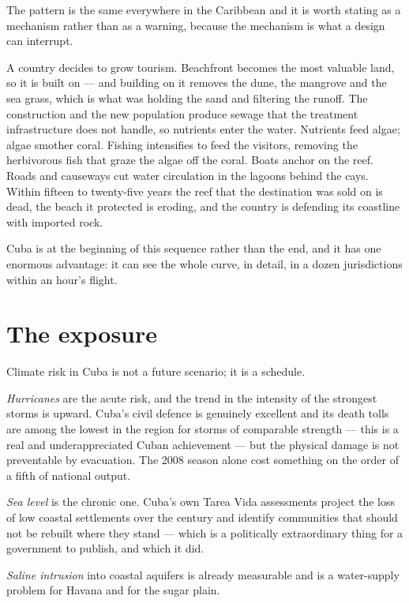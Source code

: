 The pattern is the same everywhere in the Caribbean and it is worth stating as a
mechanism rather than as a warning, because the mechanism is what a design can
interrupt.

A country decides to grow tourism. Beachfront becomes the most valuable land, so
it is built on --- and building on it removes the dune, the mangrove and the sea
grass, which is what was holding the sand and filtering the runoff. The
construction and the new population produce sewage that the treatment
infrastructure does not handle, so nutrients enter the water. Nutrients feed
algae; algae smother coral. Fishing intensifies to feed the visitors, removing
the herbivorous fish that graze the algae off the coral. Boats anchor on the
reef. Roads and causeways cut water circulation in the lagoons behind the cays.
Within fifteen to twenty-five years the reef that the destination was sold on is
dead, the beach it protected is eroding, and the country is defending its
coastline with imported rock.

Cuba is at the beginning of this sequence rather than the end, and it has one
enormous advantage: it can see the whole curve, in detail, in a dozen
jurisdictions within an hour's flight.

\section{The exposure}

Climate risk in Cuba is not a future scenario; it is a schedule.

\emph{Hurricanes} are the acute risk, and the trend in the intensity of the
strongest storms is upward. Cuba's civil defence is genuinely excellent and its
death tolls are among the lowest in the region for storms of comparable
strength --- this is a real and underappreciated Cuban achievement --- but the
physical damage is not preventable by evacuation. The 2008 season alone cost
something on the order of a fifth of national output.

\emph{Sea level} is the chronic one. Cuba's own Tarea Vida assessments project
the loss of low coastal settlements over the century and identify communities
that should not be rebuilt where they stand --- which is a politically
extraordinary thing for a government to publish, and which it did.

\emph{Saline intrusion} into coastal aquifers is already measurable and is a
water-supply problem for Havana and for the sugar plain.

